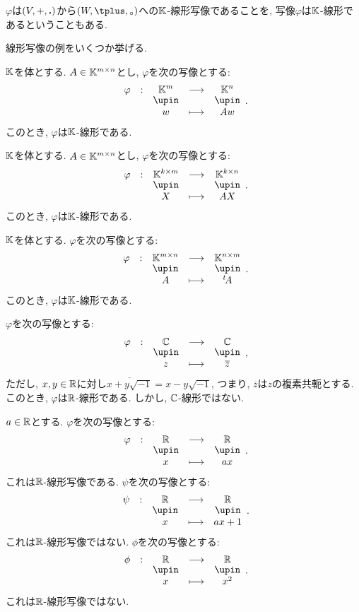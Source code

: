 \begin{definition}
  $\varphi$は$(V,+,\mathbin{\boldsymbol{.}})$から$(W,\pplus,\aact)$への$\mathbb{K}$-線形写像であることを,
  写像$\varphi$は$\mathbb{K}$-線形であるということもある.
\end{definition}

線形写像の例をいくつか挙げる.
\begin{example}
  $\mathbb{K}$を体とする.
  $A\in \mathbb{K}^{m\times n}$とし,
  $\varphi$を次の写像とする:
  \begin{align*}
    \shazo{\varphi}{\KK^m}{\KK^n}{w}{Aw}.
  \end{align*}
  このとき, $\varphi$は$\mathbb{K}$-線形である.
\end{example}

\begin{example}
  $\mathbb{K}$を体とする.
  $A\in \mathbb{K}^{m\times n}$とし,
  $\varphi$を次の写像とする:
  \begin{align*}
    \shazo{\varphi}{\KK^{k\times m}}{\KK^{k\times n}}{X}{AX}.
  \end{align*}
  このとき, $\varphi$は$\mathbb{K}$-線形である.
\end{example}

\begin{example}
  $\mathbb{K}$を体とする.
  $\varphi$を次の写像とする:
  \begin{align*}
    \shazo{\varphi}{\KK^{m\times n}}{\KK^{n\times m}}{A}{\transposed{A}}.
  \end{align*}
  このとき, $\varphi$は$\mathbb{K}$-線形である.
\end{example}

\begin{example}
  $\varphi$を次の写像とする:
  \begin{align*}
    \shazo{\varphi}{\CC}{\CC}{z}{\overline{z}},
  \end{align*}
  ただし, 
  $x,y\in\mathbb{R}$に対し$\overline{x+y\sqrt{-1}}=x-y\sqrt{-1}$, つまり,
  $\overline{z}$は$z$の複素共軛とする.
  このとき, $\varphi$は$\mathbb{R}$-線形である.
  しかし, $\mathbb{C}$-線形ではない.
\end{example}

\begin{example}
  $a\in\mathbb{R}$とする.
  $\varphi$を次の写像とする:
  \begin{align*}
    \shazo{\varphi}{\RR}{\RR}{x}{ax}.
  \end{align*}
  これは$\mathbb{R}$-線形写像である.
  $\psi$を次の写像とする:
  \begin{align*}
    \shazo{\psi}{\RR}{\RR}{x}{ax+1}.
  \end{align*}
  これは$\mathbb{R}$-線形写像ではない.
  $\phi$を次の写像とする:
  \begin{align*}
    \shazo{\phi}{\RR}{\RR}{x}{x^2}.
  \end{align*}
  これは$\mathbb{R}$-線形写像ではない.
\end{example}

